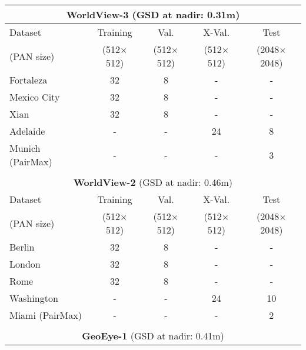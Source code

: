 \documentclass[journal]{IEEEtran}
\begin{document}
\begin{table}
\centering
\setlength{\tabcolsep}{4pt}
\begin{tabular}{lcccc}
\multicolumn{5}{c}{{\bf WorldView-3} (GSD at nadir: 0.31m)}                                     \\ \hline
Dataset           &     Training     &        Val.      &       X-Val.     &        Test        \\
(PAN size)        & (512$\times$512) & (512$\times$512) & (512$\times$512) & (2048$\times$2048) \\ \hline
Fortaleza         &               32 &                8 &                - &                  - \\
Mexico City       &               32 &                8 &                - &                  - \\
Xian              &               32 &                8 &                - &                  - \\
Adelaide          &                - &                - &               24 &                  8 \\
Munich (PairMax)  &                - &                - &                - &                  3 \\ \hline \\
\multicolumn{5}{c}{{\bf WorldView-2} (GSD at nadir: 0.46m)}                                     \\ \hline
Dataset           &     Training     &        Val.      &       X-Val.     &        Test        \\
(PAN size)        & (512$\times$512) & (512$\times$512) & (512$\times$512) & (2048$\times$2048) \\ \hline
Berlin            &               32 &                8 &                - &                  - \\
London            &               32 &                8 &                - &                  - \\
Rome              &               32 &                8 &                - &                  - \\
Washington        &                - &                - &               24 &                 10 \\
Miami (PairMax)   &                - &                - &                - &                  2 \\ \hline \\
\multicolumn{5}{c}{{\bf GeoEye-1} (GSD at nadir: 0.41m)}                                        \\ \hline

\end{tabular}
\end{table}
\end{document}
